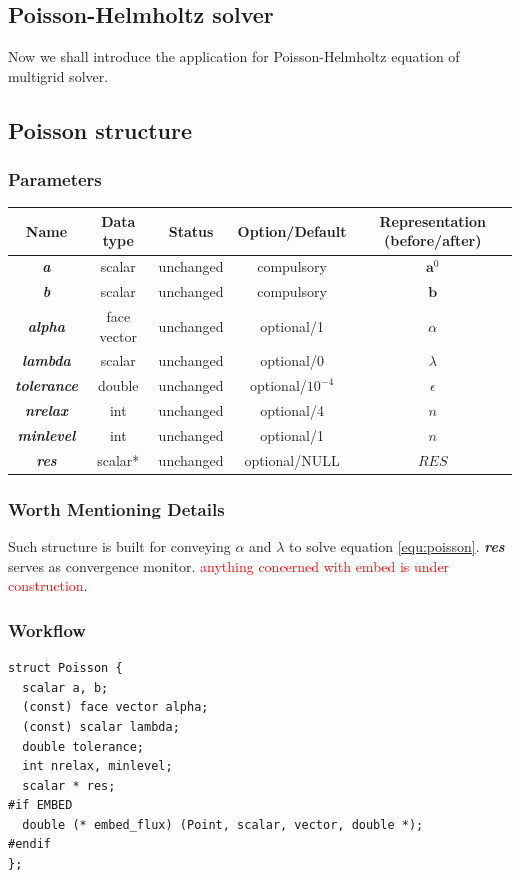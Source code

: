 \documentclass[a4paper]{article}
\newcommand{\para}[1]{\textbf{\emph{\textcolor{para}{#1}}}}
\begin{document}
\subsection{Poisson-Helmholtz solver}
Now we shall introduce the application for Poisson-Helmholtz equation of multigrid solver.
\subsection{Poisson structure}
\subsubsection{Parameters}
\begin{center}
  \begin{tabular}{|c|c|c|c|c|}
    \hline
    Name & Data type & Status & Option/Default & Representation (before/after)\\[0.5ex]
    \hline\hline
    \para{a} & scalar & unchanged & compulsory & $ \mathbf{a}^{0}$\\
    \hline
    \para{b} & scalar & unchanged & compulsory & $ \mathbf{b} $\\
    \hline
    \para{alpha} & face vector & unchanged & optional/1 & $\alpha$\\
    \hline
    \para{lambda} & scalar & unchanged & optional/0 &  $\lambda$\\
    \hline
    \para{tolerance} & double & unchanged & optional/$10^{-4}$ & $\epsilon$\\
    \hline
    \para{nrelax} & int & unchanged & optional/4 & $n$ \\
    \hline
    \para{minlevel} & int & unchanged & optional/1 & $n$ \\
    \hline
    \para{res} & scalar* & unchanged & optional/NULL & $RES$ \\
    \hline
  \end{tabular}
\end{center}
\subsubsection{Worth Mentioning Details}
Such structure is built for conveying $\alpha$ and $\lambda$ to solve equation \ref{equ:poisson}. \para{res} serves as convergence monitor. \textcolor{red}{anything concerned with embed is under construction}.

\subsubsection{Workflow}
  \begin{verbatim}
struct Poisson {
  scalar a, b;
  (const) face vector alpha;
  (const) scalar lambda;
  double tolerance;
  int nrelax, minlevel;
  scalar * res;
#if EMBED
  double (* embed_flux) (Point, scalar, vector, double *);
#endif
};
  \end{verbatim}
\end{document}
